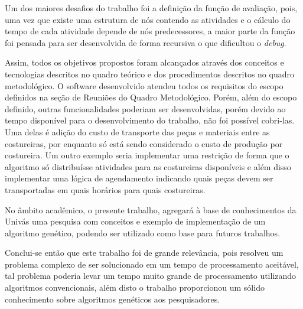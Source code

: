 \par Um dos maiores desafios do trabalho foi a definição da função de avaliação, pois, 
uma vez que existe uma estrutura de nós contendo as atividades e o cálculo do tempo de 
cada atividade depende de nós predecessores, a maior parte da função foi pensada para ser 
desenvolvida de forma recursiva o que dificultou o \textit{debug}.

\par Assim, todos os objetivos propostos foram alcançados através dos conceitos e tecnologias descritos no quadro teórico e
dos procedimentos descritos no quadro metodológico. O software desenvolvido atendeu todos os requisitos do escopo definidos 
na seção de Reuniões do Quadro Metodológico. Porém, além do escopo definido, outras funcionalidades poderiam ser desenvolvidas, 
porém devido ao tempo disponível para o desenvolvimento do trabalho, não foi possível cobri-las. Uma delas é adição do custo de 
transporte das peças e materiais entre as costureiras, por enquanto só está sendo considerado o custo de produção por costureira. 
Um outro exemplo seria implementar uma restrição de forma que o algoritmo só distribuísse atividades para as costureiras disponíveis 
e além disso  implementar uma lógica de agendamento indicando quais peças devem ser transportadas em quais horários para quais 
costureiras.

\par No âmbito acadêmico, o presente trabalho, agregará à base de conhecimentos da Univás uma pesquisa com conceitos e exemplo de
implementação de um algoritmo genético, podendo ser utilizado como base para futuros trabalhos.

\par Conclui-se então que este trabalho foi de grande relevância, pois resolveu um problema complexo de ser solucionado em um 
tempo de processamento aceitável, tal problema poderia levar um tempo muito grande de processamento utilizando algoritmos
convencionais, além disto o trabalho proporcionou um sólido conhecimento sobre algoritmos genéticos aos pesquisadores.



